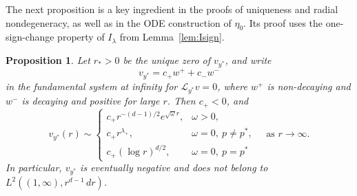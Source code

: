 \documentclass[12pt, a4paper, reqno]{amsart}
\numberwithin{equation}{section}
\newtheorem{proposition}[theorem]{Proposition}
\theoremstyle{definition}
\theoremstyle{remark}
\begin{document}
The next proposition is a key ingredient in the proofs of uniqueness and
radial nondegeneracy, as well as in the ODE construction of $\eta_0$. Its proof uses the
one-sign-change property of $I_\lambda$ from Lemma~\ref{lem:Isign}.

\begin{proposition}%
\label{prop:vstar}
Let $r_*>0$ be the unique zero of $v_{y^*}$, and write
\begin{equation}\label{eq:vdec}
  v_{y^*}=c_+w^++c_-w^-
\end{equation}
in the fundamental system at infinity for $\mathcal L_{y^*}v=0$, where
$w^+$ is non-decaying and $w^-$ is decaying and positive for large $r$.
Then $c_+<0$, and
\begin{equation}\label{eq:vasymp}
  v_{y^*}(r)\sim
  \begin{cases}
    c_+r^{-(d-1)/2}e^{\sqrt\omega r},
      &\omega>0,\\[2pt]
    c_+r^{\lambda_+},
      &\omega=0,\ p\ne p^*,\\[2pt]
    c_+(\log r)^{d/2},
      &\omega=0,\ p=p^*
  \end{cases}
  \quad\text{as }r\to\infty.
\end{equation}
In particular, $v_{y^*}$ is eventually negative and does not belong to
$L^2((1,\infty),r^{d-1}\,dr)$.
\end{proposition}
\end{document}
